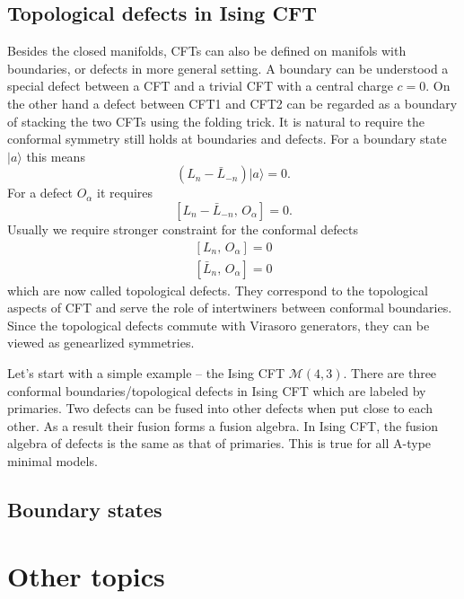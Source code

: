 \documentclass[submission, PhysLectNotes]{SciPost}
\begin{document}
\subsection{Topological defects in Ising CFT}
Besides the closed manifolds, CFTs can also be defined on manifols with boundaries, or defects in more general setting. A boundary can be understood a special defect between a CFT and a trivial CFT with a central charge $c=0$. On the other hand a defect between CFT1 and CFT2 can be regarded as a boundary of stacking the two CFTs using the folding trick. It is natural to require the conformal symmetry still holds at boundaries and defects. For a boundary state $\vert a \rangle$ this means 
\begin{equation}
	\left ( L_n - \bar{L}_{-n} \right ) \vert a \rangle = 0.
\end{equation}
For a defect $O_\alpha$ it requires
\begin{equation}
	\left[ L_n - \bar{L}_{-n},\, O_\alpha \right] = 0.
\end{equation}
Usually we require stronger constraint for the conformal defects 
\begin{equation}
	\begin{aligned}
		\left[ L_n,\, O_\alpha \right] = 0 \\
		\left[ \bar{L}_{n},\, O_\alpha \right] = 0
	\end{aligned}
\end{equation}
which are now called topological defects. They correspond to the topological aspects of CFT and serve the role of intertwiners between conformal boundaries. Since the topological defects commute with Virasoro generators, they can be viewed as genearlized symmetries. 

Let's start with a simple example -- the Ising CFT $\mathcal{M}(4,3)$. There are three conformal boundaries/topological defects in Ising CFT which are labeled by primaries. Two defects can be fused into other defects when put close to each other. As a result their fusion forms a fusion algebra. In Ising CFT, the fusion algebra of defects is the same as that of primaries. This is true for all A-type minimal models. 

\subsection{Boundary states}

\section{Other topics}
\end{document}
